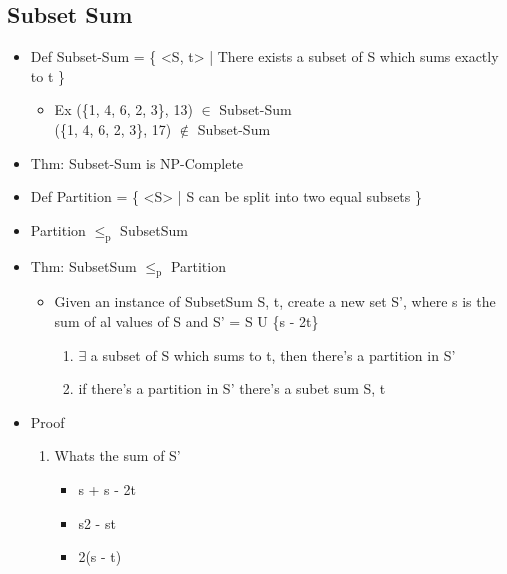 \documentclass[11pt]{article}
\begin{document}
\subsection{Subset Sum}
\label{sec:org9a18b1f}
\begin{itemize}
\item Def
Subset-Sum = \{ <S, t> | There exists a subset of S which sums exactly to t \}
\begin{itemize}
\item Ex
(\{1, 4, 6, 2, 3\}, 13) \(\in\) Subset-Sum\\
(\{1, 4, 6, 2, 3\}, 17) \(\notin\) Subset-Sum
\end{itemize}
\item Thm: Subset-Sum is NP-Complete
\item Def
Partition =  \{ <S> | S can be split into two equal subsets \}
\item Partition \(\le_{\text{p}}\) SubsetSum
\item Thm: SubsetSum \(\le_{\text{p}}\) Partition
\begin{itemize}
\item Given an instance of SubsetSum S, t, create a new set S', where
s is the sum of al values of S and S' = S U \{s - 2t\}
\begin{enumerate}
\item \(\exists\) a subset of S which sums to t, then there's a partition in S'
\item if there's a partition in S' there's a subet sum S, t
\end{enumerate}
\end{itemize}
\item Proof
\begin{enumerate}
\item Whats the sum of S'
\begin{itemize}
\item s + s - 2t
\item s2 - st
\item 2(s - t)
\end{itemize}
\end{enumerate}
\end{itemize}
\end{document}
